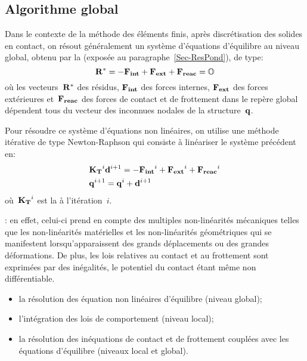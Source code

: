\medskip
\subsection{Algorithme global}

Dans le contexte de la méthode des éléments finis, après discrétisation des solides en contact, on résout généralement
un système d'équations d'équilibre au niveau global, obtenu par la  (exposée au paragraphe~\ref{Sec-ResPond}), de type:
\begin{equation}
\VV{R^*} = -\VV{F_{int}} + \VV{F_{ext}} + \VV{F_{reac}} = \VV{\mO}
\end{equation}
où les vecteurs~$\VV{R^*}$ des résidus, $\VV{F_{int}}$ des forces internes, $\VV{F_{ext}}$ des forces extérieures
et~$\VV{F_{reac}}$ des forces de contact et de frottement dans le repère global dépendent tous du vecteur
des inconnues nodales de la structure~$\VV{q}$.

\medskip
Pour résoudre ce système d'équations non linéaires, on utilise une méthode itérative
de type Newton-Raphson
qui consiste à linéariser le système précédent en:
\begin{align}
&\MM{K_T}^i \VV{d}^{i+1} = -\VV{F_{int}}^i + \VV{F_{ext}}^i+\VV{F_{reac}}^i\\
&\VV{q}^{i+1} = \VV{q}^i+\VV{d}^{i+1} 
\end{align}
où~$\MM{K_T}^i$ est la  à l'itération~$i$.

\medskip
{}:
en effet, celui-ci prend en compte
des multiples non-linéarités mécaniques telles que les non-linéarités matérielles et les non-linéarités
géométriques qui se manifestent lorsqu'apparaissent des grands déplacements ou des grandes déformations.
De plus, les lois relatives au contact et au frottement sont exprimées par des inégalités, le potentiel
du contact étant même non différentiable.
\begin{itemize}
  \item la résolution des équation non linéaires d'équilibre (niveau global);
  \item l'intégration des lois de comportement (niveau local);
  \item la résolution des inéquations de contact et de frottement couplées avec les équations
	d'équilibre (niveaux local et global).
\end{itemize}


\ifVersionAvecExemplesSepares\else
\fi

